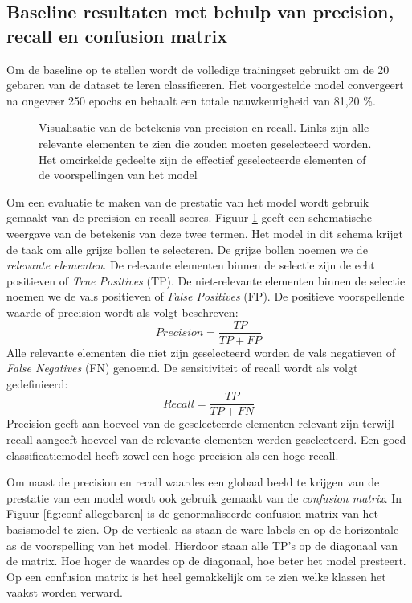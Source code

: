 \subsection{Baseline resultaten met behulp van precision, recall en confusion matrix}\label{sec:pr-conf}
Om de baseline op te stellen wordt de volledige trainingset gebruikt om de 20 gebaren van de dataset te leren classificeren. Het voorgestelde model convergeert na ongeveer 250 epochs en behaalt een totale nauwkeurigheid van 81,20 \%.

\begin{figure}[!t]
	\centering
	\def\svgwidth{0.7\columnwidth}
	
	\caption{Visualisatie van de betekenis van precision en recall. Links zijn alle relevante elementen te zien die zouden moeten geselecteerd worden. Het omcirkelde gedeelte zijn de effectief geselecteerde elementen of de voorspellingen van het model}
	\label{fig:prec+recall}
\end{figure}
\npar Om een evaluatie te maken van de prestatie van het model wordt gebruik gemaakt van de precision en recall scores. Figuur \ref{fig:prec+recall} geeft een schematische weergave van de betekenis van deze twee termen. Het model in dit schema krijgt de taak om alle grijze bollen te selecteren. De grijze bollen noemen we de \textit{relevante elementen}. De relevante elementen binnen de selectie zijn de echt positieven of \textit{True Positives} (TP). De niet-relevante elementen binnen de selectie noemen we de vals positieven of \textit{False Positives} (FP). De positieve voorspellende waarde of precision wordt als volgt beschreven:
\begin{equation}
Precision = \frac{TP}{TP+FP}
\end{equation}
Alle relevante elementen die niet zijn geselecteerd worden de vals negatieven of \textit{False Negatives} (FN) genoemd. De sensitiviteit of recall wordt als volgt gedefinieerd:
\begin{equation}
Recall = \frac{TP}{TP+FN}
\end{equation}
Precision geeft aan hoeveel van de geselecteerde elementen relevant zijn terwijl recall aangeeft hoeveel van de relevante elementen werden geselecteerd. Een goed classificatiemodel heeft zowel een hoge precision als een hoge recall.

\npar Om naast de precision en recall waardes een globaal beeld te krijgen van de prestatie van een model wordt ook gebruik gemaakt van de \textit{confusion matrix}. In Figuur \ref{fig:conf-allegebaren} is de genormaliseerde confusion matrix van het basismodel te zien. Op de verticale as staan de ware labels en op de horizontale as de voorspelling van het model. Hierdoor staan alle TP's op de diagonaal van de matrix. Hoe hoger de waardes op de diagonaal, hoe beter het model presteert. Op een confusion matrix is het heel gemakkelijk om te zien welke klassen het vaakst worden verward.

